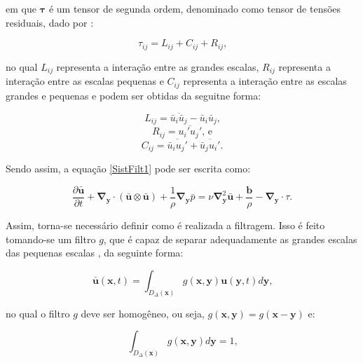\documentclass[_ArquivoPrincipal.tex]{subfiles}
\begin{document}
\noindent em que $\mathbf{\tau}$ é um tensor de segunda ordem, denominado como tensor de tensões residuais, dado por \cite{leonard1975energy}:

\begin{equation}
    \tau_{ij}=L_{ij}+C_{ij}+R_{ij}\text{,}
    \label{TensRes}
\end{equation}

\noindent no qual $L_{ij}$ representa a interação entre as grandes escalas, $R_{ij}$ representa a interação entre as escalas pequenas e $C_{ij}$ representa a interação entre as escalas grandes e pequenas e podem ser obtidas da seguitne forma:

\begin{equation}
    L_{ij}=\overline{\bar{u}_i\bar{u}_j}-\bar{u}_i\bar{u}_j\text{,}
    \label{Lij}
\end{equation}
\begin{equation}
    R_{ij}=\overline{u_i'u_j'}\text{, e}
    \label{Cij}
\end{equation}
\begin{equation}
    C_{ij}=\overline{\bar{u}_iu_j'}+\overline{\bar{u}_ju_i'}\text{.}
    \label{Rij}
\end{equation}

Sendo assim, a equação \ref{SistFilt1} pode ser escrita como:

\begin{equation}
    \frac{\partial\bar{\mathbf{u}}}{\partial t}+\mathbf{\nabla}_\mathbf{y}\cdot{(\bar{\mathbf{u}}\otimes\bar{\mathbf{u}})}+\frac{1}{\rho}\mathbf{\nabla}_\mathbf{y}\bar{p}=\nu\mathbf{\nabla}^2_\mathbf{y}\bar{\mathbf{u}}+\frac{\mathbf{b}}{\rho}-\mathbf{\nabla}_\mathbf{y}\cdot\tau\text{.}
    \label{EqFiltrada}
\end{equation}

Assim, torna-se necessário definir como é realizada a filtragem. Isso é feito tomando-se um filtro $g$, que é capaz de separar adequadamente as grandes escalas das pequenas escalas \cite{hughes2000large}, da seguinte forma:

\begin{equation}
    \bar{\mathbf{u}}(\mathbf{x},t)=\int_{D_\Delta(\mathbf{x})}{g(\mathbf{x},\mathbf{y})\mathbf{u}(\mathbf{y},t)d\mathbf{y}}\text{,}
    \label{Filtro1}
\end{equation}

\noindent no qual o filtro $g$ deve ser homogêneo, ou seja, $g(\mathbf{x},\mathbf{y})=g(\mathbf{x}-\mathbf{y})$ e:

\begin{equation}
    \int_{D_\Delta(\mathbf{x})}{g(\mathbf{x},\mathbf{y})d\mathbf{y}}=1\text{,}
    \label{Filtro2}
\end{equation}
\end{document}
